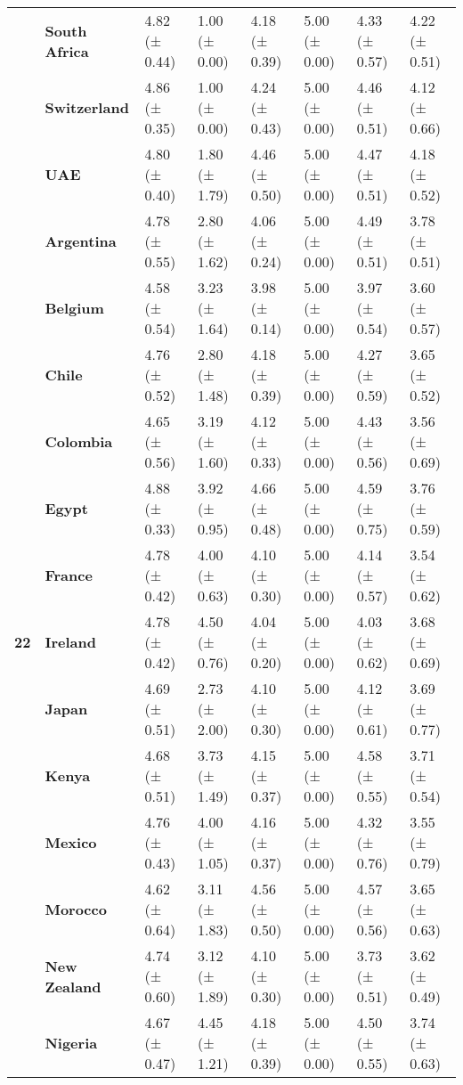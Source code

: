 \begin{longtable}{llllllll}
\textbf{} & \textbf{South Africa} & 4.82 (± 0.44) & 1.00 (± 0.00) & 4.18 (± 0.39) & 5.00 (± 0.00) & 4.33 (± 0.57) & 4.22 (± 0.51) \\
\textbf{} & \textbf{Switzerland} & 4.86 (± 0.35) & 1.00 (± 0.00) & 4.24 (± 0.43) & 5.00 (± 0.00) & 4.46 (± 0.51) & 4.12 (± 0.66) \\
\textbf{} & \textbf{UAE} & 4.80 (± 0.40) & 1.80 (± 1.79) & 4.46 (± 0.50) & 5.00 (± 0.00) & 4.47 (± 0.51) & 4.18 (± 0.52) \\
\cline{1-8}
\multirow[t]{19}{*}{\textbf{22}} & \textbf{Argentina} & 4.78 (± 0.55) & 2.80 (± 1.62) & 4.06 (± 0.24) & 5.00 (± 0.00) & 4.49 (± 0.51) & 3.78 (± 0.51) \\
\textbf{} & \textbf{Belgium} & 4.58 (± 0.54) & 3.23 (± 1.64) & 3.98 (± 0.14) & 5.00 (± 0.00) & 3.97 (± 0.54) & 3.60 (± 0.57) \\
\textbf{} & \textbf{Chile} & 4.76 (± 0.52) & 2.80 (± 1.48) & 4.18 (± 0.39) & 5.00 (± 0.00) & 4.27 (± 0.59) & 3.65 (± 0.52) \\
\textbf{} & \textbf{Colombia} & 4.65 (± 0.56) & 3.19 (± 1.60) & 4.12 (± 0.33) & 5.00 (± 0.00) & 4.43 (± 0.56) & 3.56 (± 0.69) \\
\textbf{} & \textbf{Egypt} & 4.88 (± 0.33) & 3.92 (± 0.95) & 4.66 (± 0.48) & 5.00 (± 0.00) & 4.59 (± 0.75) & 3.76 (± 0.59) \\
\textbf{} & \textbf{France} & 4.78 (± 0.42) & 4.00 (± 0.63) & 4.10 (± 0.30) & 5.00 (± 0.00) & 4.14 (± 0.57) & 3.54 (± 0.62) \\
\textbf{} & \textbf{Ireland} & 4.78 (± 0.42) & 4.50 (± 0.76) & 4.04 (± 0.20) & 5.00 (± 0.00) & 4.03 (± 0.62) & 3.68 (± 0.69) \\
\textbf{} & \textbf{Japan} & 4.69 (± 0.51) & 2.73 (± 2.00) & 4.10 (± 0.30) & 5.00 (± 0.00) & 4.12 (± 0.61) & 3.69 (± 0.77) \\
\textbf{} & \textbf{Kenya} & 4.68 (± 0.51) & 3.73 (± 1.49) & 4.15 (± 0.37) & 5.00 (± 0.00) & 4.58 (± 0.55) & 3.71 (± 0.54) \\
\textbf{} & \textbf{Mexico} & 4.76 (± 0.43) & 4.00 (± 1.05) & 4.16 (± 0.37) & 5.00 (± 0.00) & 4.32 (± 0.76) & 3.55 (± 0.79) \\
\textbf{} & \textbf{Morocco} & 4.62 (± 0.64) & 3.11 (± 1.83) & 4.56 (± 0.50) & 5.00 (± 0.00) & 4.57 (± 0.56) & 3.65 (± 0.63) \\
\textbf{} & \textbf{New Zealand} & 4.74 (± 0.60) & 3.12 (± 1.89) & 4.10 (± 0.30) & 5.00 (± 0.00) & 3.73 (± 0.51) & 3.62 (± 0.49) \\
\textbf{} & \textbf{Nigeria} & 4.67 (± 0.47) & 4.45 (± 1.21) & 4.18 (± 0.39) & 5.00 (± 0.00) & 4.50 (± 0.55) & 3.74 (± 0.63) \\

\end{longtable}
